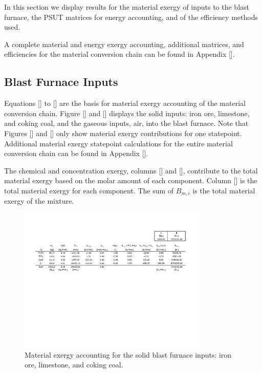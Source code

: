 \documentclass[energies,article,submit,pdftex,moreauthors]{Definitions/mdpi}
\begin{document}
In this section we display results
for the material exergy
of inputs to the blast furnace,
the PSUT matrices for energy accounting,
and of the efficiency methods used.

A complete material and energy exergy accounting,
additional matrices,
and efficiencies
for the material conversion chain
can be found in Appendix [].
\subsection{Blast Furnace Inputs}

Equations [] to [] are the basis for material exergy accounting
of the material conversion chain.
Figure [] and [] displays the solid inputs: iron ore, limestone, and coking coal,
and the gaseous inputs, air,
into the blast furnace.
Note that Figures [] and []
only show material exergy contributions
for one statepoint.
Additional material exergy statepoint calculations
for the entire material conversion chain
can be found in Appendix [].


The chemical and concentration exergy,
columns [] and [],
contribute to the total material exergy
based on the molar amount
of each component.
Column [] is the total material exergy
for each component.
The sum of $B_{m,i}$
is the total material exergy
of the mixture.


\begin{figure}[h!]
  \centering
  \includegraphics[width=0.8\textwidth]{images/Solid BF Inputs.pdf}
  \caption{Material exergy accounting for the solid blast furnace inputs: iron ore, limestone, and coking coal.}
  \label{fig:Solid Blast Furnace Inputs}
\end{figure}
\end{document}
